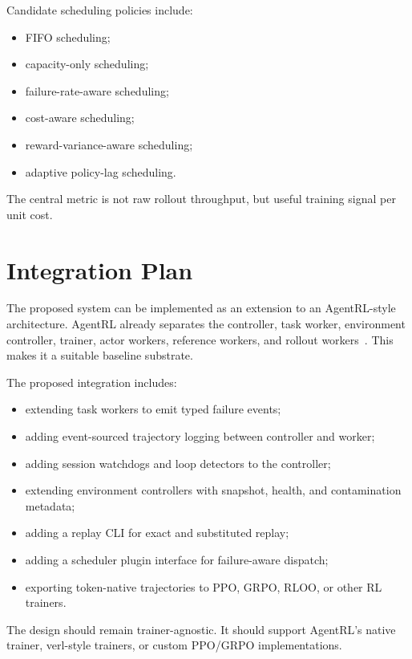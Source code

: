 \documentclass[11pt]{article}
\begin{document}
Candidate scheduling policies include:

\begin{itemize}[leftmargin=*]
    \item FIFO scheduling;
    \item capacity-only scheduling;
    \item failure-rate-aware scheduling;
    \item cost-aware scheduling;
    \item reward-variance-aware scheduling;
    \item adaptive policy-lag scheduling.
\end{itemize}

The central metric is not raw rollout throughput, but useful training signal per unit cost.

\section{Integration Plan}

The proposed system can be implemented as an extension to an AgentRL-style architecture.
AgentRL already separates the controller, task worker, environment controller, trainer, actor workers, reference workers, and rollout workers~\cite{zhang2025agentrl}.
This makes it a suitable baseline substrate.

The proposed integration includes:

\begin{itemize}[leftmargin=*]
    \item extending task workers to emit typed failure events;
    \item adding event-sourced trajectory logging between controller and worker;
    \item adding session watchdogs and loop detectors to the controller;
    \item extending environment controllers with snapshot, health, and contamination metadata;
    \item adding a replay CLI for exact and substituted replay;
    \item adding a scheduler plugin interface for failure-aware dispatch;
    \item exporting token-native trajectories to PPO, GRPO, RLOO, or other RL trainers.
\end{itemize}

The design should remain trainer-agnostic.
It should support AgentRL's native trainer, verl-style trainers, or custom PPO/GRPO implementations.
\end{document}
